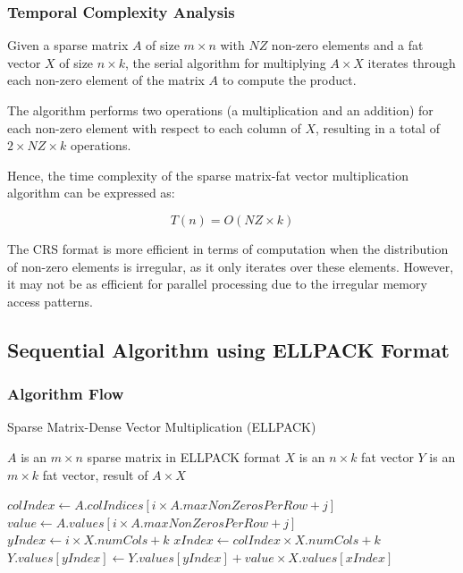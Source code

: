 \documentclass[12pt,oneside]{book} %
\begin{document}
\subsubsection{Temporal Complexity Analysis}
Given a sparse matrix $A$ of size $m \times n$ with $NZ$ non-zero elements and
a fat vector $X$ of size $n \times k$, the serial algorithm for multiplying \(A
\times X\) iterates through each non-zero element of the matrix \(A\) to
compute the product.

The algorithm performs two operations (a multiplication and an addition) for
each non-zero element with respect to each column of \(X\), resulting in a
total of \(2 \times NZ \times k\) operations.

Hence, the time complexity of the sparse matrix-fat vector multiplication
algorithm can be expressed as:

\begin{equation}
    T(n) = O(NZ \times k)
\end{equation}

The CRS format is more efficient in terms of computation when the distribution
of non-zero elements is irregular, as it only iterates over these elements.
However, it may not be as efficient for parallel processing due to the
irregular memory access patterns.

\newpage
\subsection{Sequential Algorithm using ELLPACK Format}

\subsubsection{Algorithm Flow}

\begin{algorithm}[H]
    \caption{Sparse Matrix-Dense Vector Multiplication (ELLPACK)}
    \begin{algorithmic}
        \Require $A$ is an $m \times n$ sparse matrix in ELLPACK format
        \Require $X$ is an $n \times k$ fat vector
        \Ensure  $Y$ is an $m \times k$ fat vector, result of $A \times X$

        \State $colIndex \gets A.colIndices[i \times A.maxNonZerosPerRow + j]$
        \State $value \gets A.values[i \times A.maxNonZerosPerRow + j]$
        \State $yIndex \gets i \times X.numCols + k$
        \State $xIndex \gets colIndex \times X.numCols + k$
        \State $Y.values[yIndex] \gets Y.values[yIndex] + value \times X.values[xIndex]$
        \EndFor
        \EndIf
        \EndFor
        \EndFor
    \end{algorithmic}
\end{algorithm}
\end{document}
